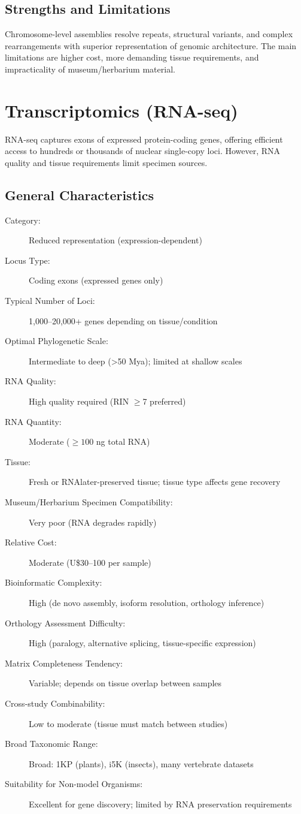 \subsection{Strengths and Limitations}

Chromosome-level assemblies resolve repeats, structural variants, and complex rearrangements with superior representation of genomic architecture. The main limitations are higher cost, more demanding tissue requirements, and impracticality of museum/herbarium material.

\textcite{rhie2021, guiglielmoni2024, formenti2022}

\section{Transcriptomics (RNA-seq)}

RNA-seq captures exons of expressed protein-coding genes, offering efficient access to hundreds or thousands of nuclear single-copy loci. However, RNA quality and tissue requirements limit specimen sources.

\subsection{General Characteristics}

\begin{description}
\item[Category:] Reduced representation (expression-dependent)
\item[Locus Type:] Coding exons (expressed genes only)
\item[Typical Number of Loci:] 1,000--20,000+ genes depending on tissue/condition
\item[Optimal Phylogenetic Scale:] Intermediate to deep (>50 Mya); limited at shallow scales
\item[RNA Quality:] High quality required (RIN $\geq$7 preferred)
\item[RNA Quantity:] Moderate (\(\geq 100\) ng total RNA)
\item[Tissue:] Fresh or RNAlater-preserved tissue; tissue type affects gene recovery
\item[Museum/Herbarium Specimen Compatibility:] Very poor (RNA degrades rapidly)
\item[Relative Cost:] Moderate (U\$30--100 per sample)
\item[Bioinformatic Complexity:] High (de novo assembly, isoform resolution, orthology inference)
\item[Orthology Assessment Difficulty:] High (paralogy, alternative splicing, tissue-specific expression)
\item[Matrix Completeness Tendency:] Variable; depends on tissue overlap between samples
\item[Cross-study Combinability:] Low to moderate (tissue must match between studies)
\item[Broad Taxonomic Range:] Broad: 1KP (plants), i5K (insects), many vertebrate datasets
\item[Suitability for Non-model Organisms:] Excellent for gene discovery; limited by RNA preservation requirements
\end{description}

